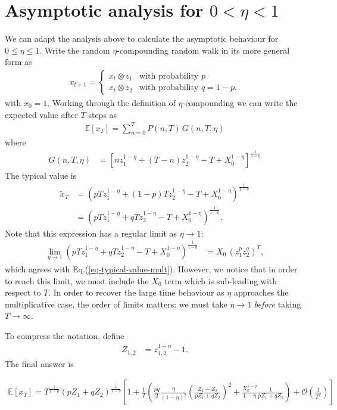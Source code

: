 \documentclass[11pt]{article}
\begin{document}
\section{Asymptotic analysis for $ 0 < \eta < 1$}

We can adapt the analysis above to calculate the asymptotic behaviour for $0 \leq \eta \leq 1$. Write the random $\eta$-compounding random walk in its more general form as
\begin{align}
\label{eq-etaRandomWalk2}
x_{t+1} = \left\{ 
\begin{array}{ll}
x_t \otimes z_1 & \text{with probability $p$}\\
x_t \otimes z_2  & \text{with probability $q=1-p$}.
\end{array}
\right.
\end{align}
with $x_0 = 1$.
Working through the definition of $\eta$-compounding we can write the expected value after $T$ steps as
\begin{align}
 \mathbb{E}\left[x_T \right]  =  \sum_{n=0}^T  P(n,T) \,G(n, T, \eta)
\end{align}
where
\begin{align}
G(n, T, \eta) &= \left[ n z_1^{1-\eta} + (T-n) z_2^{1-\eta} -T + X_0^{1-\eta}\right]^\frac{1}{1-\eta}
\end{align}
The typical value is
\begin{align}
\nonumber \widetilde{x}_T &= \left( p T z_1^{1-\eta} + (1-p) T z_2^{1-\eta} - T+X_0^{1-\eta} \right)^\frac{1}{1-\eta}\\
\label{eq-typical-value-eta}&=  \left( p T z_1^{1-\eta} +  q T z_2^{1-\eta} - T+X_0^{1-\eta} \right)^\frac{1}{1-\eta}.
\end{align}
Note that this expression has a regular limit as $\eta \to 1$:
\begin{align}
\lim_{\eta \to 1}  \left( p T z_1^{1-\eta} +  q T z_2^{1-\eta} - T+X_0^{1-\eta} \right)^\frac{1}{1-\eta} &= X_0\,\left( z_1^p z_2^q \right)^T,
\end{align}
which agrees with Eq.(\ref{eq-typical-value-mult}). However, we notice that in order to reach this limit,
we must include the $X_0$ term which is sub-leading with respect to $T$. In order to recover the large time behaviour as $\eta$ approaches the multiplicative case, the order of limits matters: we must take $\eta \to 1$ {\em before} taking $T \to \infty$.

To compress the notation, define
\begin{align*}
Z_{1,2} &= z_{1,2}^{1-\eta}-1.
\end{align*}
The final answer is

\begin{align*}
\mathbb{E}\left[x_T\right] = T^\frac{1}{1-\eta} \left( p Z_1 + q Z_2\right)^\frac{1}{1-\eta} \left[ 1+  
\frac{1}{T}\left( \frac{p q}{2}\frac{\eta}{(1-\eta)^2}\left(\frac{Z_1-Z_2}{pZ_1+q Z_2}\right)^2 + \frac{X_0^{1-\eta}}{1-\eta} \frac{1}{p Z_1+q Z_2}\right)
+ \mathcal{O}\left(\frac{1}{T^2}\right) \right]
\end{align*}



\end{document}
